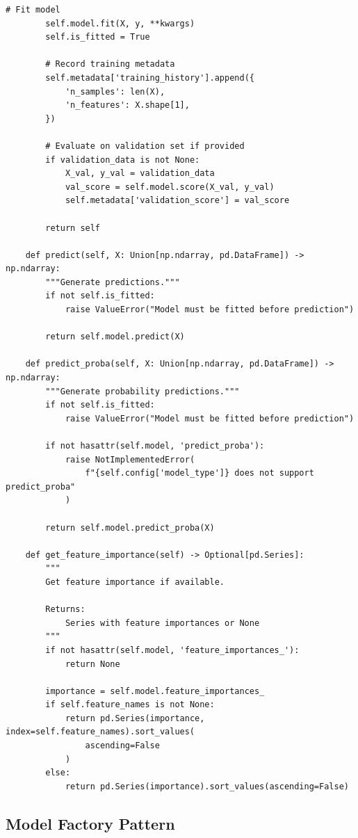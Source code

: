 \begin{lstlisting}[style=python, caption=Sklearn-based model implementation]
        # Fit model
        self.model.fit(X, y, **kwargs)
        self.is_fitted = True

        # Record training metadata
        self.metadata['training_history'].append({
            'n_samples': len(X),
            'n_features': X.shape[1],
        })

        # Evaluate on validation set if provided
        if validation_data is not None:
            X_val, y_val = validation_data
            val_score = self.model.score(X_val, y_val)
            self.metadata['validation_score'] = val_score

        return self

    def predict(self, X: Union[np.ndarray, pd.DataFrame]) -> np.ndarray:
        """Generate predictions."""
        if not self.is_fitted:
            raise ValueError("Model must be fitted before prediction")

        return self.model.predict(X)

    def predict_proba(self, X: Union[np.ndarray, pd.DataFrame]) -> np.ndarray:
        """Generate probability predictions."""
        if not self.is_fitted:
            raise ValueError("Model must be fitted before prediction")

        if not hasattr(self.model, 'predict_proba'):
            raise NotImplementedError(
                f"{self.config['model_type']} does not support predict_proba"
            )

        return self.model.predict_proba(X)

    def get_feature_importance(self) -> Optional[pd.Series]:
        """
        Get feature importance if available.

        Returns:
            Series with feature importances or None
        """
        if not hasattr(self.model, 'feature_importances_'):
            return None

        importance = self.model.feature_importances_
        if self.feature_names is not None:
            return pd.Series(importance, index=self.feature_names).sort_values(
                ascending=False
            )
        else:
            return pd.Series(importance).sort_values(ascending=False)
\end{lstlisting}

\subsection{Model Factory Pattern}

